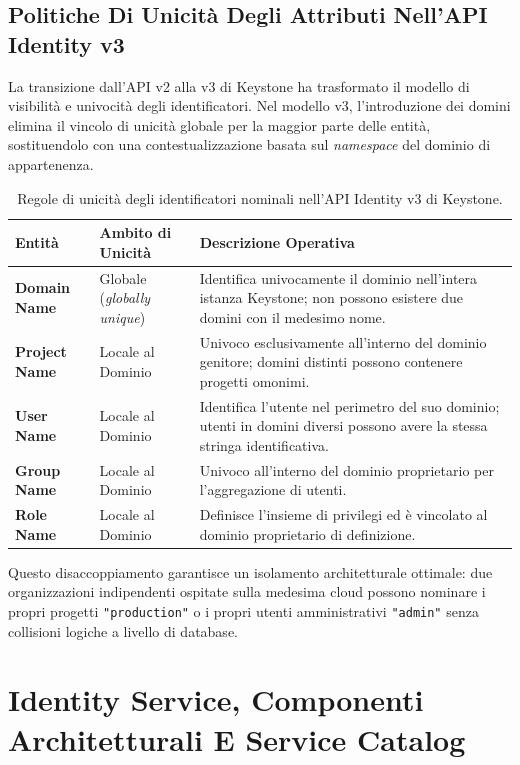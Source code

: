 \documentclass[11pt, a4paper]{article}
\begin{document}
\subsection{Politiche Di Unicità Degli Attributi Nell'API Identity v3}

La transizione dall'API v2 alla v3 di Keystone ha trasformato il modello di visibilità e univocità degli identificatori. Nel modello v3, l'introduzione dei domini elimina il vincolo di unicità globale per la maggior parte delle entità, sostituendolo con una contestualizzazione basata sul \emph{namespace} del dominio di appartenenza.

\begin{table}[H]
\centering
\small
\begin{tabularx}{\textwidth}{l p{5cm} X}
\toprule
\textbf{Entità} & \textbf{Ambito di Unicità} & \textbf{Descrizione Operativa} \\
\midrule
\textbf{Domain Name} & Globale (\emph{globally unique}) & Identifica univocamente il dominio nell'intera istanza Keystone; non possono esistere due domini con il medesimo nome. \\
\textbf{Project Name} & Locale al Dominio & Univoco esclusivamente all'interno del dominio genitore; domini distinti possono contenere progetti omonimi. \\
\textbf{User Name} & Locale al Dominio & Identifica l'utente nel perimetro del suo dominio; utenti in domini diversi possono avere la stessa stringa identificativa. \\
\textbf{Group Name} & Locale al Dominio & Univoco all'interno del dominio proprietario per l'aggregazione di utenti. \\
\textbf{Role Name} & Locale al Dominio & Definisce l'insieme di privilegi ed è vincolato al dominio proprietario di definizione. \\
\bottomrule
\end{tabularx}
\caption{Regole di unicità degli identificatori nominali nell'API Identity v3 di Keystone.}
\end{table}

Questo disaccoppiamento garantisce un isolamento architetturale ottimale: due organizzazioni indipendenti ospitate sulla medesima cloud possono nominare i propri progetti \texttt{"production"} o i propri utenti amministrativi \texttt{"admin"} senza collisioni logiche a livello di database.

\newpage

\section{Identity Service, Componenti Architetturali E Service Catalog}
\end{document}
